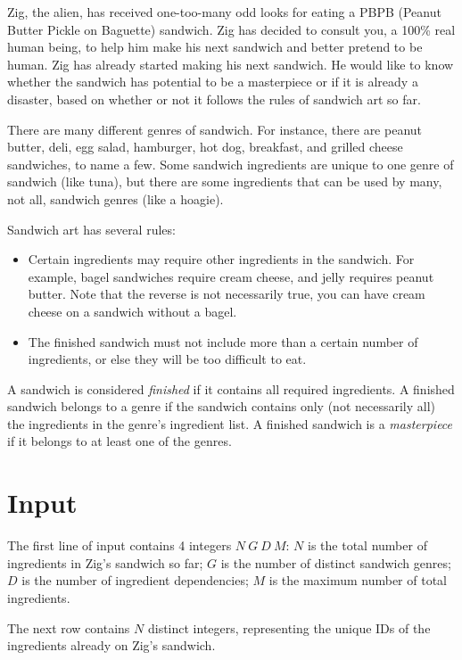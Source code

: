 
Zig, the alien, has received one-too-many odd looks for eating a PBPB
(Peanut Butter Pickle on Baguette) sandwich.
Zig has decided to consult you, a 100\% real human being,
to help him make his next sandwich and better pretend to be human.
Zig has already started making his next sandwich.
He would like to know whether the sandwich has potential to be a masterpiece
or if it is already a disaster, based on whether or not it follows the rules of sandwich art so far.

There are many different genres of sandwich.
For instance, there are peanut butter, deli, egg salad, hamburger, hot dog, breakfast,
and grilled cheese sandwiches, to name a few.
Some sandwich ingredients are unique to one genre of sandwich (like tuna),
but there are some ingredients that can be used by many, not all, sandwich genres (like a hoagie).

Sandwich art has several rules:
%
\begin{itemize}
    \item Certain ingredients may require other ingredients in the sandwich.
    For example, bagel sandwiches require cream cheese, and jelly requires peanut butter.
    Note that the reverse is not necessarily true, you can have cream cheese
    on a sandwich without a bagel.
    \item The finished sandwich must not include more than a certain number of ingredients,
    or else they will be too difficult to eat.
\end{itemize}

A sandwich is considered \emph{finished} if it contains all required ingredients.
A finished sandwich belongs to a genre if the sandwich contains only (not necessarily all)
the ingredients in the genre's ingredient list.
A finished sandwich is a \emph{masterpiece} if it belongs to at least one of the genres.

\section*{Input}
The first line of input contains 4 integers $N\ G\ D\ M$: $N$
is the total number of ingredients in Zig's sandwich so far; $G$ is
the number of distinct sandwich genres; $D$ is the number of
ingredient dependencies; $M$ is the maximum number of total
ingredients.
%

The next row contains $N$ distinct integers, representing the unique IDs
of the ingredients already on Zig's sandwich.

